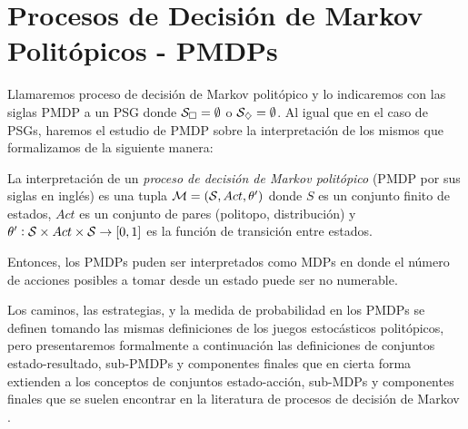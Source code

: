 \section{Procesos de Decisión de Markov Politópicos - PMDPs}
\label{sec:pmdp}

Llamaremos proceso de decisión de Markov politópico y lo indicaremos con las
siglas PMDP a un PSG donde $\mathcal{S}_\square = \emptyset$ o $\mathcal{S}_\diamondsuit = \emptyset$.
Al igual que en el caso de PSGs, haremos el estudio de PMDP sobre la
interpretación de los mismos que formalizamos de la siguiente manera:

\begin{definition}
	La interpretación de un \textit{proceso de decisión de Markov politópico} (PMDP por sus siglas en inglés) es una tupla $\mathcal{M} = (\mathcal{S}, Act, \theta')$ donde $S$ es un conjunto finito de estados, $Act$ es un conjunto de pares (politopo, distribución) y $\theta': \mathcal{S} \times Act \times \mathcal{S} \rightarrow [0, 1]$ es la función de transición entre estados.
\end{definition}

Entonces, los PMDPs puden ser interpretados como MDPs en donde el número de
acciones posibles a tomar desde un estado puede ser no numerable.


Los caminos, las estrategias, y la medida de probabilidad en los PMDPs se
definen tomando las mismas definiciones de los juegos estocásticos politópicos,
pero presentaremos formalmente a continuación las definiciones de conjuntos
estado-resultado, sub-PMDPs y componentes finales que en cierta forma extienden
a los conceptos de conjuntos estado-acción, sub-MDPs y componentes finales que
se suelen encontrar en la literatura de procesos de decisión de Markov
\cite{AlfaroThesis,BaierKatoen}.

